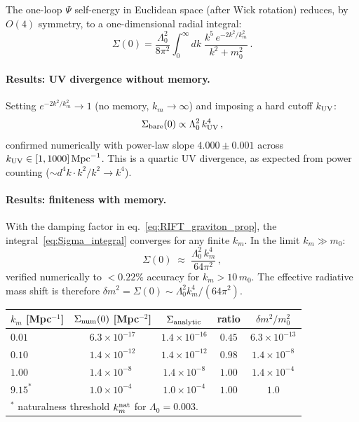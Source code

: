 \documentclass[12pt,a4paper]{article}
\begin{document}
The one-loop $\Psi$ self-energy in Euclidean space (after Wick rotation)
reduces, by $O(4)$ symmetry, to a one-dimensional radial integral:
\begin{equation}
\Sigma(0) = \frac{\Lambda_0^2}{8\pi^2}
\int_0^\infty dk\;\frac{k^5\,e^{-2k^2/k_m^2}}{k^2 + m_0^2}\,.
\label{eq:Sigma_integral}
\end{equation}

\paragraph{Results: UV divergence without memory.}
Setting $e^{-2k^2/k_m^2} \to 1$ (no memory, $k_m \to \infty$) and
imposing a hard cutoff $k_{\rm UV}$:
\begin{equation}
\Sigma_{\rm bare}(0) \propto \Lambda_0^2\,k_{\rm UV}^4\,,
\end{equation}
confirmed numerically with power-law slope $4.000 \pm 0.001$ across
$k_{\rm UV} \in [1, 1000]\,\mathrm{Mpc}^{-1}$.
This is a quartic UV divergence, as expected from power counting
($\sim d^4k \cdot k^2/k^2 \to k^4$).

\paragraph{Results: finiteness with memory.}
With the damping factor in eq.~\eqref{eq:RIFT_graviton_prop}, the
integral~\eqref{eq:Sigma_integral} converges for any finite $k_m$.
In the limit $k_m \gg m_0$:
\begin{equation}
\Sigma(0) \;\approx\; \frac{\Lambda_0^2\,k_m^4}{64\pi^2}\,,
\label{eq:Sigma_analytic}
\end{equation}
verified numerically to $<0.22\%$ accuracy for $k_m > 10\,m_0$.
The effective radiative mass shift is therefore
$\delta m^2 = \Sigma(0) \sim \Lambda_0^2 k_m^4 / (64\pi^2)$.

\begin{center}
\begin{tabular}{lcccc}
\toprule
$k_m$ [Mpc$^{-1}$] & $\Sigma_{\rm num}(0)$ [Mpc$^{-2}$] & $\Sigma_{\rm analytic}$ & ratio & $\delta m^2/m_0^2$ \\
\midrule
$0.01$ & $6.3\times10^{-17}$ & $1.4\times10^{-16}$ & $0.45$ & $6.3\times10^{-13}$ \\
$0.10$ & $1.4\times10^{-12}$ & $1.4\times10^{-12}$ & $0.98$ & $1.4\times10^{-8}$ \\
$1.00$ & $1.4\times10^{-8\phantom{0}}$  & $1.4\times10^{-8}$  & $1.00$ & $1.4\times10^{-4}$ \\
$9.15^*$ & $1.0\times10^{-4\phantom{0}}$  & $1.0\times10^{-4}$  & $1.00$ & $1.0$ \\
\bottomrule
\multicolumn{5}{l}{\footnotesize $^*$ naturalness threshold $k_m^{\rm nat}$ for $\Lambda_0=0.003$.}
\end{tabular}
\end{center}
\end{document}
